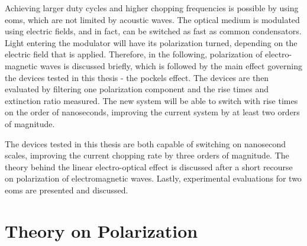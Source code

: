 \begin{figure}[t]
	\label{fig:aom_chopping}
\end{figure}

Achieving larger duty cycles and higher chopping frequencies is possible by using \acp{eom}, which are not limited by acoustic waves. The optical medium is modulated using electric fields, and in fact, can be switched as fast as common condensators. Light entering the modulator will have its polarization turned, depending on the electric field that is applied. Therefore, in the following, polarization of electro-magnetic waves is discussed briefly, which is followed by the main effect governing the devices tested in this thesis - the pockels effect. The devices are then evaluated by filtering one polarization component and the rise times and extinction ratio measured. The new system will be able to switch with rise times on the order of nanoseconds, improving the current system by at least two orders of magnitude.

The devices tested in this thesis are both capable of switching on nanosecond scales, improving the current chopping rate by three orders of magnitude. The theory behind the linear electro-optical effect is discussed after a short recourse on polarization of electromagnetic waves. Lastly, experimental evaluations for two \acp{eom} are presented and discussed.



\section{Theory on Polarization}

\label{sec:pol}

